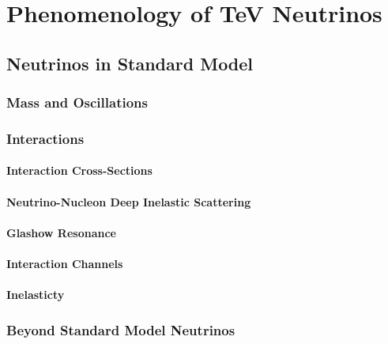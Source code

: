 \setchapterpreamble[u]{\margintoc}
\chapter{Phenomenology of TeV Neutrinos}




\section{Neutrinos in Standard Model}
\label{sec:sm_nu}

\subsection{Mass and Oscillations}
\label{sec:nu_mass_osc}

\subsection{Interactions}
\label{sec:nu_interactions}

\subsubsection*{Interaction Cross-Sections}
\label{sec:xsec}

\subsubsection*{Neutrino-Nucleon Deep Inelastic Scattering}
\label{sec:DIS}

\subsubsection*{Glashow Resonance}
\label{sec:glashow}

\subsubsection*{Interaction  Channels}
\label{sec:int_channels}

\subsubsection*{Inelasticty}
\label{sec:inelasticity}


\subsection{Beyond Standard Model Neutrinos}
\label{sec:bsm}